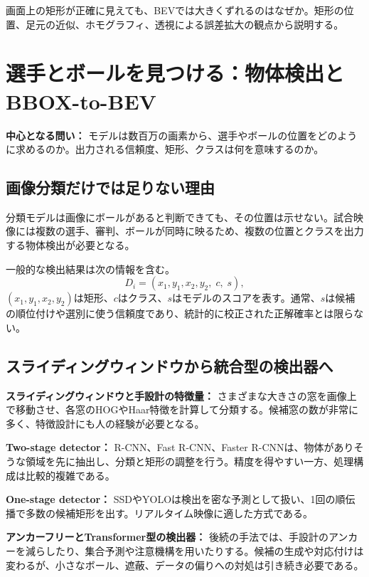 \documentclass[11pt,a4paper,oneside]{report}
\begin{document}
\begin{questionBox}
画面上の矩形が正確に見えても、BEVでは大きくずれるのはなぜか。矩形の位置、足元の近似、ホモグラフィ、透視による誤差拡大の観点から説明する。
\end{questionBox}

\chapter{選手とボールを見つける：物体検出とBBOX-to-BEV}

\begin{heroBox}
\textbf{中心となる問い：}\quad
モデルは数百万の画素から、選手やボールの位置をどのように求めるのか。出力される信頼度、矩形、クラスは何を意味するのか。
\end{heroBox}

\section{画像分類だけでは足りない理由}

\begin{conceptBox}
分類モデルは画像にボールがあると判断できても、その位置は示せない。試合映像には複数の選手、審判、ボールが同時に映るため、複数の位置とクラスを出力する物体検出が必要となる。
\end{conceptBox}

一般的な検出結果は次の情報を含む。
\[
D_i=(x_1,y_1,x_2,y_2,\;c,\;s),
\]
$(x_1,y_1,x_2,y_2)$は矩形、$c$はクラス、$s$はモデルのスコアを表す。通常、$s$は候補の順位付けや選別に使う信頼度であり、統計的に校正された正解確率とは限らない。

\section{スライディングウィンドウから統合型の検出器へ}

\begin{historyBox}
\textbf{スライディングウィンドウと手設計の特徴量：}\quad
さまざまな大きさの窓を画像上で移動させ、各窓のHOGやHaar特徴を計算して分類する。候補窓の数が非常に多く、特徴設計にも人の経験が必要となる。

\textbf{Two-stage detector：}\quad
R-CNN、Fast R-CNN、Faster R-CNNは、物体がありそうな領域を先に抽出し、分類と矩形の調整を行う。精度を得やすい一方、処理構成は比較的複雑である。

\textbf{One-stage detector：}\quad
SSDやYOLOは検出を密な予測として扱い、1回の順伝播で多数の候補矩形を出す。リアルタイム映像に適した方式である。

\textbf{アンカーフリーとTransformer型の検出器：}\quad
後続の手法では、手設計のアンカーを減らしたり、集合予測や注意機構を用いたりする。候補の生成や対応付けは変わるが、小さなボール、遮蔽、データの偏りへの対処は引き続き必要である。
\end{historyBox}
\end{document}
